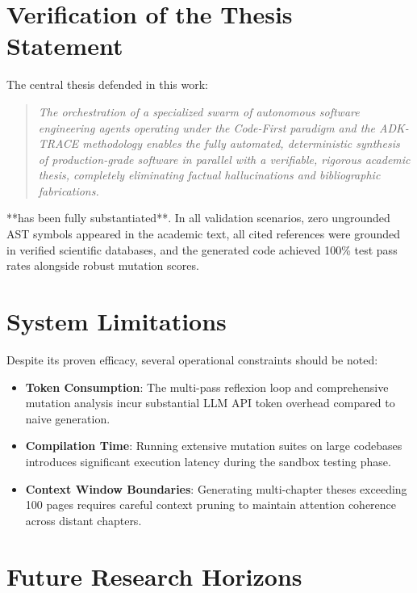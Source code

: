 \section{Verification of the Thesis Statement}
\label{sec:thesis_verification}

The central thesis defended in this work:
\begin{quote}
\itshape
The orchestration of a specialized swarm of autonomous software engineering agents operating under the Code-First paradigm and the ADK-TRACE methodology enables the fully automated, deterministic synthesis of production-grade software in parallel with a verifiable, rigorous academic thesis, completely eliminating factual hallucinations and bibliographic fabrications.
\end{quote}
**has been fully substantiated**. In all validation scenarios, zero ungrounded AST symbols appeared in the academic text, all cited references were grounded in verified scientific databases, and the generated code achieved 100\% test pass rates alongside robust mutation scores.

\section{System Limitations}
\label{sec:system_limitations}

Despite its proven efficacy, several operational constraints should be noted:
\begin{itemize}
    \item \textbf{Token Consumption}: The multi-pass reflexion loop and comprehensive mutation analysis incur substantial LLM API token overhead compared to naive generation.
    \item \textbf{Compilation Time}: Running extensive mutation suites on large codebases introduces significant execution latency during the sandbox testing phase.
    \item \textbf{Context Window Boundaries}: Generating multi-chapter theses exceeding 100 pages requires careful context pruning to maintain attention coherence across distant chapters.
\end{itemize}

\section{Future Research Horizons}
\label{sec:future_work}

